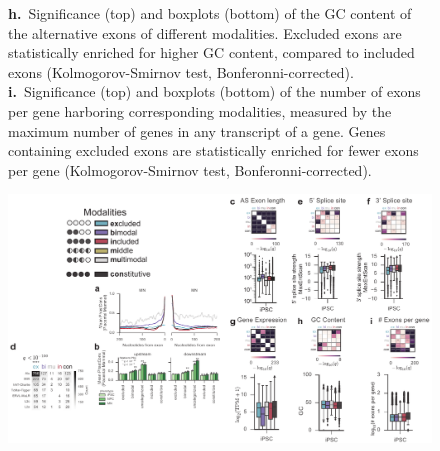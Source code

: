 \begin{figure}[h]
{\textbf{h.}~Significance (top) and boxplots (bottom) of the GC content of the alternative exons of different modalities. Excluded exons are statistically enriched for higher GC content, compared to included exons (Kolmogorov-Smirnov test, Bonferonni-corrected).\\
\textbf{i.}~Significance (top) and boxplots (bottom) of the number of exons per gene harboring corresponding modalities, measured by the maximum number of genes in any transcript of a gene. Genes containing excluded exons are statistically enriched for fewer exons per gene (Kolmogorov-Smirnov test, Bonferonni-corrected).\\
}
\label{fig:modality_features_supplementary_part1}

\end{figure}
\clearpage
\begin{figure}[h]
\ContinuedFloat
\captionsetup{labelformat=empty}
\centering
\includegraphics[width=5.8in]{figures/modality_features_supplementary_part1.pdf}
\end{figure}
\addtocounter{figure}{1}
\clearpage


